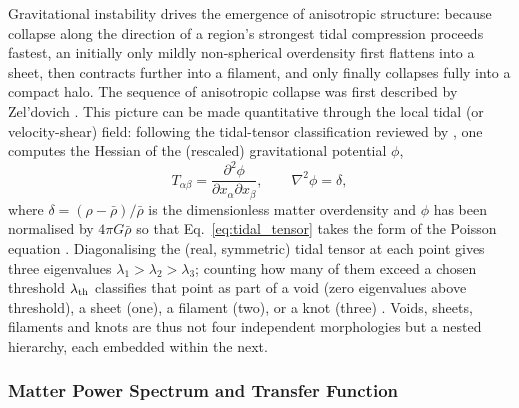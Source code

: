 \documentclass{report}
\begin{document}
Gravitational instability drives the emergence of anisotropic structure: because collapse along the direction of a region's strongest tidal compression proceeds fastest, an initially only mildly non-spherical overdensity first flattens into a sheet, then contracts further into a filament, and only finally collapses fully into a compact halo. The sequence of anisotropic collapse was first described by Zel'dovich \cite{libeskind_tracing_2018}. This picture can be made quantitative through the local tidal (or velocity-shear) field: following the tidal-tensor classification reviewed by \citeauthor{libeskind_tracing_2018} \cite{libeskind_tracing_2018}, one computes the Hessian of the (rescaled) gravitational potential $\phi$,
\begin{equation}
  T_{\alpha\beta} = \frac{\partial^2 \phi}{\partial x_\alpha \partial x_\beta}, \qquad \nabla^2 \phi = \delta,
  \label{eq:tidal_tensor}
\end{equation}
where $\delta = (\rho - \bar\rho)/\bar\rho$ is the dimensionless matter overdensity and $\phi$ has been normalised by $4\pi G \bar\rho$ so that Eq.~\eqref{eq:tidal_tensor} takes the form of the Poisson equation \cite{libeskind_tracing_2018}. Diagonalising the (real, symmetric) tidal tensor at each point gives three eigenvalues $\lambda_1 > \lambda_2 > \lambda_3$; counting how many of them exceed a chosen threshold $\lambda_{\rm th}$ classifies that point as part of a void (zero eigenvalues above threshold), a sheet (one), a filament (two), or a knot (three) \cite{libeskind_tracing_2018}. Voids, sheets, filaments and knots are thus not four independent morphologies but a nested hierarchy, each embedded within the next.

\subsubsection{Matter Power Spectrum and Transfer Function}
\label{sec:power_spectrum}
\end{document}
